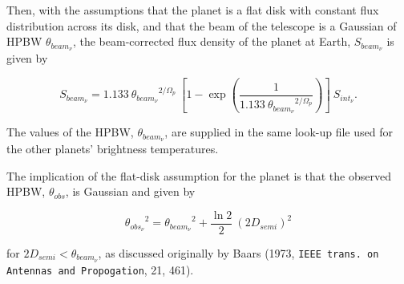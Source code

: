 \documentclass[11pt,twoside]{article}
\renewcommand{\_}{\texttt{\symbol{95}}}
\begin{document}
Then, with the assumptions that the planet is a flat disk with constant flux distribution across its disk, and that the beam of the telescope is a Gaussian of HPBW $\theta_{beam_\nu}$, the beam-corrected flux density of the planet at Earth, $S_{beam_\nu}$ is given by

\begin{displaymath}
S_{beam_\nu} = 1.133\ {\theta_{beam_\nu}}^{2/\Omega_p}\ [1 - \exp({\frac{1}{1.133\ {\theta_{beam_\nu}}^{2/\Omega_p} }})]\ S_{int_\nu}.
\end{displaymath}

The values of the HPBW, $\theta_{beam_\nu}$, are supplied in the same look-up file used for the other planets' brightness temperatures.

The implication of the flat-disk assumption for the planet is that the observed HPBW, $\theta_{obs}$, is Gaussian and given by

\begin{displaymath}
{\theta_{obs_\nu}}^2 = {\theta_{beam_\nu}}^2 + \frac{\ln 2}{2}\ {(2 D_{semi})}^2
\end{displaymath}

for $2 D_{semi} < \theta_{beam_\nu}$, as discussed originally by Baars (1973, {\tt{IEEE trans.\ on Antennas and Propogation}}, 21, 461).
\end{document}
